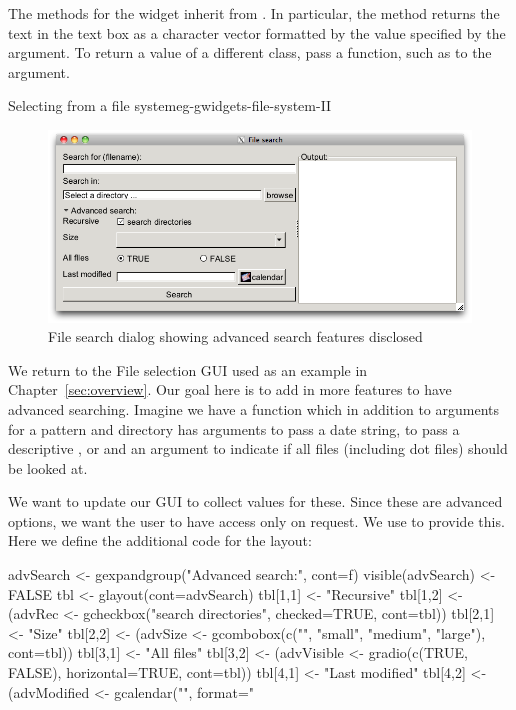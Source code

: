 The methods for the widget inherit from . In particular,
the  method returns the text in the text box
as a character vector formatted by the value specified by the
 argument. To return a value of a
different class, pass a function, such as  to the
 argument.



\begin{example}{Selecting from a file system}{eg-gwidgets-file-system-II}

\begin{figure}
  \centering
  \includegraphics[width=.8\textwidth]{fig-gWidgets-file-search-advanced.png}
  \caption{File search dialog showing advanced search features disclosed}
  \label{fig:file-search-advanced}
\end{figure}

We return to the File selection GUI used as an example in
Chapter~\ref{sec:overview}. Our goal here is to add in more features
to have advanced searching. Imagine we have a function  which in
addition to arguments for  a pattern and directory has arguments
 to pass a date string,  to pass a
descriptive ,  or  and an
argument  to indicate if all files (including dot files)
should be looked at. 

We want to update our GUI to collect values for these.
Since these are advanced options, we want the user to have access only
on request. We use  to provide this. Here we define
the additional code for the layout:


\begin{Schunk}
\begin{Sinput}
 advSearch <- gexpandgroup("Advanced search:", cont=f)
 visible(advSearch) <- FALSE
 tbl <- glayout(cont=advSearch)
 tbl[1,1] <- "Recursive"
 tbl[1,2] <- (advRec <- 
    gcheckbox("search directories", checked=TRUE, cont=tbl))
 tbl[2,1] <- "Size"
 tbl[2,2] <- (advSize <- 
    gcombobox(c("", "small", "medium", "large"),  cont=tbl))
 tbl[3,1] <- "All files"
 tbl[3,2] <- (advVisible <- 
    gradio(c(TRUE, FALSE), horizontal=TRUE, cont=tbl))
 tbl[4,1] <- "Last modified"
 tbl[4,2] <- (advModified <- 
              gcalendar("", format="%
\end{Sinput}
\end{Schunk}


\end{example}
